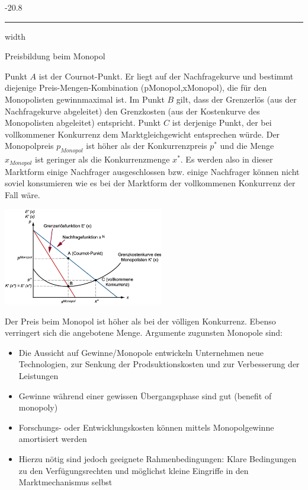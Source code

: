 \documentclass[9pt, landscape, fleqn]{scrartcl}
\makeatletter
\renewcommand{\subsubsection}{\@startsection{subsubsection}{1}{0mm}%
{-2\baselineskip}{0.8\baselineskip}%
{\hrule depth 0.2pt width\columnwidth\vspace*{1.2em}\normalsize\bfseries\rmfamily}}
\makeatother
\begin{document}
\begin{multicols*}{3}
\subsubsection{Preisbildung beim Monopol}

Punkt $A$ ist der Cournot-Punkt. Er liegt auf der Nachfragekurve und bestimmt diejenige Preis-Mengen-Kombination (pMonopol,xMonopol), die für den Monopolisten gewinnmaximal ist. Im Punkt $B$ gilt, dass der Grenzerlös (aus der Nachfragekurve abgeleitet) den Grenzkosten (aus der Kostenkurve des Monopolisten abgeleitet) entspricht. Punkt $C$ ist derjenige Punkt, der bei vollkommener Konkurrenz dem Marktgleichgewicht entsprechen würde. Der Monopolpreis $p_{Monopol}$ ist höher als der Konkurrenzpreis $p^*$ und die Menge $x_{Monopol}$ ist geringer als die Konkurrenzmenge $x^*$. Es werden also in dieser Marktform einige Nachfrager ausgeschlossen bzw. einige Nachfrager können nicht soviel konsumieren wie es bei der Marktform der vollkommenen Konkurrenz der Fall wäre.

\begin{center}
    \includegraphics[width=7cm]{Preisbildung_Monopol.png}
\end{center}

Der Preis beim Monopol ist höher als bei der völligen Konkurrenz. Ebenso verringert sich die angebotene Menge. Argumente zugunsten Monopole sind:

\begin{itemize}
    \item Die Aussicht auf Gewinne/Monopole entwickeln Unternehmen neue Technologien, zur Senkung der Prodsuktionskosten und zur Verbesserung der Leistungen 
    \item Gewinne während einer gewissen Übergangsphase sind gut (benefit of monopoly)
    \item Forschungs- oder Entwicklungskosten können mittels Monopolgewinne amortisiert werden 
    \item Hierzu nötig sind jedoch geeignete Rahmenbedingungen: Klare Bedingungen zu den Verfügungsrechten und möglichst kleine Eingriffe in den Marktmechanismus selbst 
\end{itemize}


\end{multicols*}
\end{document}
